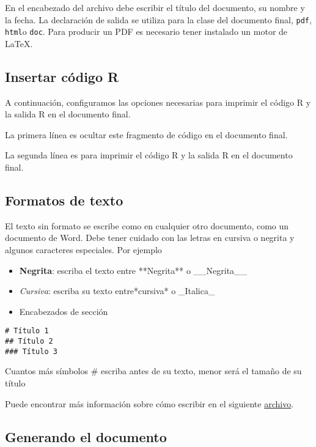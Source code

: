 \documentclass[
]{book}
\providecommand{\tightlist}{%
  \setlength{\itemsep}{0pt}\setlength{\parskip}{0pt}}
\begin{document}
En el encabezado del archivo debe escribir el título del documento, su nombre y la fecha. La declaración de salida se utiliza para la clase del documento final, \texttt{pdf}, \texttt{html}o \texttt{doc}. Para producir un PDF es necesario tener instalado un motor de LaTeX.

\hypertarget{insertar-cuxf3digo-r}{%
\subsection{Insertar código R}\label{insertar-cuxf3digo-r}}

A continuación, configuramos las opciones necesarias para imprimir el código R y la salida R en el documento final.

La primera línea es ocultar este fragmento de código en el documento final.

La segunda línea es para imprimir el código R y la salida R en el documento final.

\hypertarget{formatos-de-texto}{%
\subsection{Formatos de texto}\label{formatos-de-texto}}

El texto sin formato se escribe como en cualquier otro documento, como un documento de Word. Debe tener cuidado con las letras en cursiva o negrita y algunos caracteres especiales. Por ejemplo

\begin{itemize}
\tightlist
\item
  \textbf{Negrita}: escriba el texto entre **Negrita** o \_\_Negrita\_\_
\item
  \emph{Cursiva}: escriba su texto entre*cursiva* o \_Italica\_
\item
  Encabezados de sección
\end{itemize}

\begin{verbatim}
# Título 1
## Título 2
### Título 3
\end{verbatim}

Cuantos más símbolos \# escriba antes de su texto, menor será el tamaño de su título

Puede encontrar más información sobre cómo escribir en el siguiente \href{https://rstudio.com/wp-content/uploads/2015/02/rmarkdown-cheatsheet.pdf}{archivo}.

\hypertarget{generando-el-documento}{%
\subsection{Generando el documento}\label{generando-el-documento}}
\end{document}
